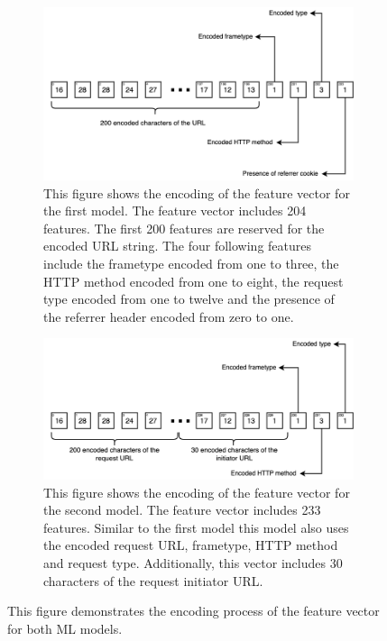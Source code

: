 \begin{figure}[ht!]  
  \centering
  \begin{subfigure}[b]{.47\textwidth}
      \centering
      \includegraphics[width=\linewidth ]{images/model1.png}
      \caption{This figure shows the encoding of the feature vector for the first model. The feature vector includes 204 features. The first 200 features are reserved for the encoded URL
   string. The four following features include the frametype encoded from one to three, the HTTP method encoded from one to eight, the 
 request type encoded from one to twelve and the presence of the referrer header encoded from zero to one.}
      \label{fig:featModel1}
  \end{subfigure}
  \hfill
  \begin{subfigure}[b]{.47\textwidth}
      \centering
      \includegraphics[width=\linewidth, keepaspectratio]{images/model2.png}
      \caption{This figure shows the encoding of the feature vector for the second model. The feature vector includes 233 features. Similar to the 
        first model this model also uses the encoded request URL, frametype, HTTP method and request type. Additionally, this vector includes 30 characters
        of the request initiator URL.
      }
      \label{fig:featModel2}
  \end{subfigure}
  \label{}
  \caption{This figure demonstrates the encoding process of the feature vector for both ML models.}
\end{figure}  

